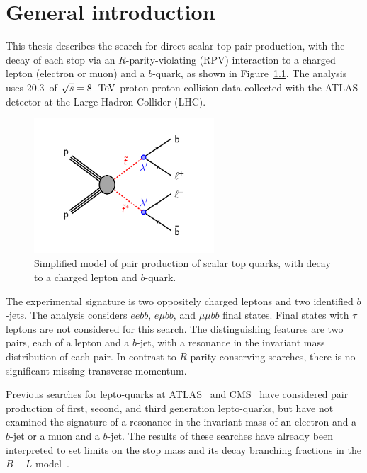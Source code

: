 \chapter[General introduction][General introduction]{General introduction}
\label{ch:intro}

This thesis describes the search for direct scalar top pair production, with
the decay of each stop via an $R$-parity-violating (RPV) interaction to a
charged lepton (electron or muon) and a $b$-quark, as shown in
Figure~\ref{fig:blstop_diagram}.
The analysis uses 20.3~\ifb of $\sqrt{s}=8~\TeV$ proton-proton collision data
collected with the ATLAS detector at the Large Hadron Collider (LHC).

\begin{figure}[ht]
  \centering
  \includegraphics[width=0.60\textwidth]{figs/blstop/b_minus_l_stop_stop.pdf}
  \caption{Simplified model of pair production of scalar top quarks, with
    decay to a charged lepton and $b$-quark.
  }
  \label{fig:blstop_diagram}
\end{figure}


The experimental signature is two oppositely charged leptons and two identified
$b$-jets.
The analysis considers $eebb$, $e \mu bb$, and $\mu \mu bb$ final states.
Final states with $\tau$ leptons are not considered for this search.
The distinguishing features are two pairs, each of a lepton and a $b$-jet, with
a resonance in the invariant mass distribution of each pair.
In contrast to $R$-parity conserving searches, there is no significant missing
transverse momentum.

Previous searches for lepto-quarks at ATLAS~\cite{ATLAS:2013oea,
ATLAS:2012aq, Aad:2011ch, Aad:2011uv} and
CMS~\cite{Khachatryan:2014ura, CMS:2014qpa, Chatrchyan:2012sv,
Chatrchyan:2012vza} have considered pair production of first, second,
and third generation lepto-quarks, but have not examined the signature
of a resonance in the invariant mass of an electron and a $b$-jet or a
muon and a $b$-jet.  The results of these searches have already been
interpreted to set limits on the stop mass and its decay
branching fractions in the $B-L$
model~\cite{Marshall:2014cwa, Marshall:2014kea}.

